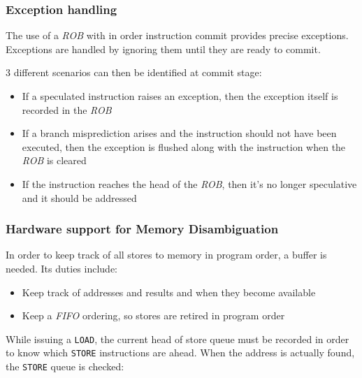 \documentclass[english]{article}
\begin{document}
\subsubsection{Exception handling}

The use of a \textit{ROB} with in order instruction commit provides precise exceptions.
Exceptions are handled by ignoring them until they are ready to commit.

3 different scenarios can then be identified at commit stage:

\begin{itemize}
  \item If a speculated instruction raises an exception, then the exception itself is recorded in the \textit{ROB}
  \item If a branch misprediction arises and the instruction should not have been executed, then the exception is flushed along with the instruction when the \textit{ROB} is cleared
  \item If the instruction reaches the head of the \textit{ROB}, then it's no longer speculative and it should be addressed
\end{itemize}

\subsubsection{Hardware support for Memory Disambiguation}

In order to keep track of all stores to memory in program order, a buffer is needed.
Its duties include:

\begin{itemize}
  \item Keep track of addresses and results and when they become available
  \item Keep a \textit{FIFO} ordering, so stores are retired in program order
\end{itemize}

While issuing a \texttt{LOAD}, the current head of store queue must be recorded in order to know which \texttt{STORE} instructions are ahead.
When the address is actually found, the \texttt{STORE} queue is checked:
\end{document}
